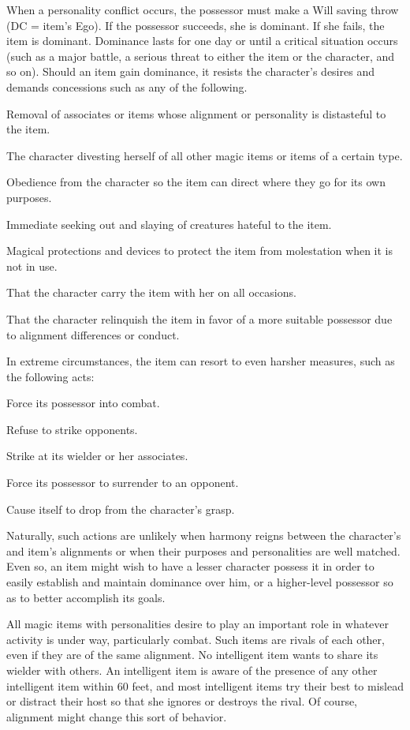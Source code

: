 When a personality conflict occurs, the possessor must make a Will saving throw (DC = item's Ego). If the possessor succeeds, she is dominant. If she fails, the item is dominant. Dominance lasts for one day or until a critical situation occurs (such as a major battle, a serious threat to either the item or the character, and so on). Should an item gain dominance, it resists the character's desires and demands concessions such as any of the following.
\item Removal of associates or items whose alignment or personality is distasteful to the item.
\item The character divesting herself of all other magic items or items of a certain type.
\item Obedience from the character so the item can direct where they go for its own purposes.
\item Immediate seeking out and slaying of creatures hateful to the item.
\item Magical protections and devices to protect the item from molestation when it is not in use.
\item That the character carry the item with her on all occasions.
\item That the character relinquish the item in favor of a more suitable possessor due to alignment differences or conduct.

In extreme circumstances, the item can resort to even harsher measures, such as the following acts:
\item Force its possessor into combat.
\item Refuse to strike opponents.
\item Strike at its wielder or her associates.
\item Force its possessor to surrender to an opponent.
\item Cause itself to drop from the character's grasp.



Naturally, such actions are unlikely when harmony reigns between the character's and item's alignments or when their purposes and personalities are well matched. Even so, an item might wish to have a lesser character possess it in order to easily establish and maintain dominance over him, or a higher-level possessor so as to better accomplish its goals.

All magic items with personalities desire to play an important role in whatever activity is under way, particularly combat. Such items are rivals of each other, even if they are of the same alignment. No intelligent item wants to share its wielder with others. An intelligent item is aware of the presence of any other intelligent item within 60 feet, and most intelligent items try their best to mislead or distract their host so that she ignores or destroys the rival. Of course, alignment might change this sort of behavior. 

